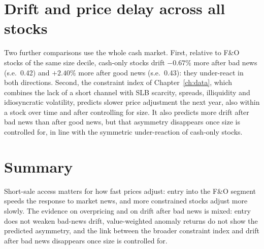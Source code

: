 \section{Drift and price delay across all stocks}
Two further comparisons use the whole cash market. First, relative to F\&O stocks of the same size decile, cash-only stocks
drift $-0.67\%$ more after bad news (s.e.\ 0.42) and $+2.40\%$ more after good news (s.e.\ 0.43): they under-react in both
directions. Second, the constraint index of Chapter~\ref{ch:data}, which combines the lack of a short channel with SLB
scarcity, spreads, illiquidity and idiosyncratic volatility, predicts slower price adjustment the next year, also within a
stock over time and after controlling for size. It also predicts more drift after bad news than after good news, but that
asymmetry disappears once size is controlled for, in line with the symmetric under-reaction of cash-only stocks.

\section{Summary}
Short-sale access matters for how fast prices adjust: entry into the F\&O segment speeds the response to market news, and
more constrained stocks adjust more slowly. The evidence on overpricing and on drift after bad news is mixed: entry does
not weaken bad-news drift, value-weighted anomaly returns do not show the predicted asymmetry, and the link between the
broader constraint index and drift after bad news disappears once size is controlled for.
